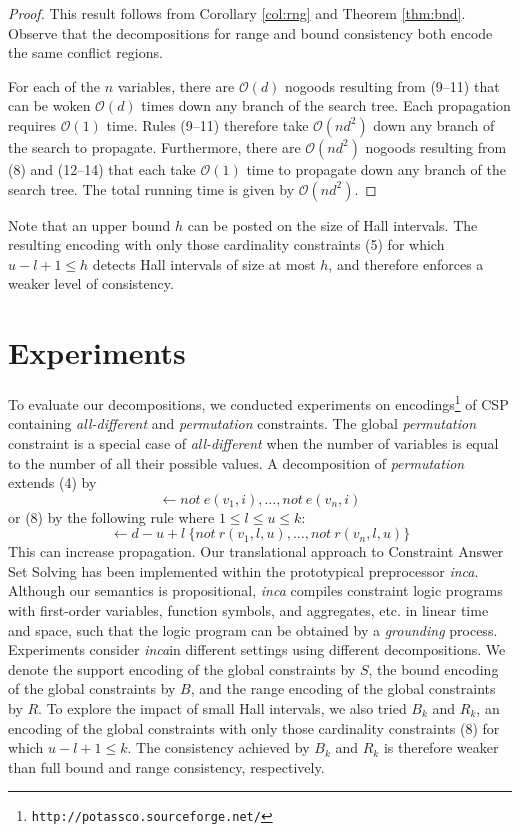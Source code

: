\documentclass{tlp}
\newcommand{\systemname}[1]{\emph{#1}}
\newcommand{\dneg}{not\ }
\newcommand{\encsup}{$S$}
\newcommand{\encbou}{$B$}
\newcommand{\encran}{$R$}
\newcommand{\encbouh}[1]{\encbou$_{#1}$}
\newcommand{\encranh}[1]{\encran$_{#1}$}
\begin{document}
\begin{proof} This result follows from Corollary \ref{col:rng} and Theorem \ref{thm:bnd}. Observe that the decompositions for range and bound consistency both encode the same conflict regions.

For each of the $n$ variables, there are $\mathcal{O}(d)$ nogoods resulting from (9--11) that can be woken $\mathcal{O}(d)$ times down any branch of the search tree. Each propagation requires $\mathcal{O}(1)$ time. Rules (9--11) therefore take $\mathcal{O}(nd^2)$ down any branch of the search to propagate. Furthermore, there are $\mathcal{O}(nd^2)$ nogoods resulting from (8) and (12--14) that each take $\mathcal{O}(1)$ time to propagate down any branch of the search tree. The total running time is given by $\mathcal{O}(nd^2)$.
\end{proof}
Note that an upper bound $h$ can be posted on the size of Hall intervals. The resulting encoding with only those cardinality constraints (5) for which $u - l + 1 \leq h$ detects Hall intervals of size at most $h$, and therefore enforces a weaker level of consistency.


\section{Experiments} \label{sec:exp}

To evaluate our decompositions, we conducted experiments on encodings\footnote[1]{\texttt{http://potassco.sourceforge.net/}} of CSP containing \emph{all-different} and \emph{permutation} constraints.
The global \emph{permutation} constraint is a special case of \emph{all-different} when the number of variables is equal to the number of all their possible values. A decomposition of \emph{permutation} extends (4) by
\[
\leftarrow \dneg e(v_1, i), \dots, \dneg e(v_n, i)
\]
or (8) by the following rule where $1 \leq l \leq u \leq k$:
\[
\leftarrow d-u+l\ \{ \dneg r(v_1, l, u), \dots, \dneg r(v_n, l, u) \}
\]
This can increase propagation.
Our translational approach to Constraint Answer Set Solving has been implemented within the prototypical preprocessor \systemname{inca}.
Although our semantics is propositional, \systemname{inca} compiles constraint logic programs with first-order variables, function symbols, and aggregates, etc. in linear time and space, such that the logic program can be obtained by a \emph{grounding} process.
Experiments consider \systemname{inca}\footnotemark[1] in different settings using different decompositions. We denote the support encoding of the global constraints by \encsup, the bound encoding of the global constraints by \encbou, and the range encoding of the global constraints by \encran. To explore the impact of small Hall intervals, we also tried \encbouh{k} and \encranh{k}, an encoding of the global constraints with only those cardinality constraints (8) for which $u-l+1 \leq k$. The consistency achieved by \encbouh{k} and \encranh{k} is therefore weaker than full bound and range consistency, respectively.
\end{document}
